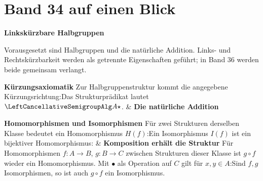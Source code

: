 \chapter[Band 34: Linkskürzbare Halbgruppen]{Band 34 auf einen Blick}
\noindent\textbf{Linkskürzbare Halbgruppen}\par\medskip
Vorausgesetzt sind Halbgruppen und die natürliche Addition.
Links- und Rechtskürzbarkeit werden als getrennte Eigenschaften geführt;
in Band 36 werden beide gemeinsam verlangt.

\begin{BandUebersicht}
\textbf{Kürzungsaxiomatik}
Zur Halbgruppenstruktur kommt die angegebene Kürzungsrichtung:Das Strukturprädikat lautet \(\LeftCancellativeSemigroupAlg A\star\).
&
\textbf{Die natürliche Addition}
 \\
\addlinespace[.8ex]

\textbf{Homomorphismen und Isomorphismen}
Für zwei Strukturen derselben Klasse bedeutet ein Homomorphismus
\(H(f)\):Ein Isomorphismus \(I(f)\) ist ein bijektiver Homomorphismus:
&
\textbf{Komposition erhält die Struktur}
Für Homomorphismen \(f:A\to B\), \(g:B\to C\) zwischen
Strukturen dieser Klasse ist \(g\circ f\) wieder ein Homomorphismus.
Mit \(\bullet\) als Operation auf \(C\) gilt für \(x,y\in A\):Sind \(f,g\) Isomorphismen, so ist auch \(g\circ f\) ein Isomorphismus.
 \\
\addlinespace[.8ex]
\end{BandUebersicht}

